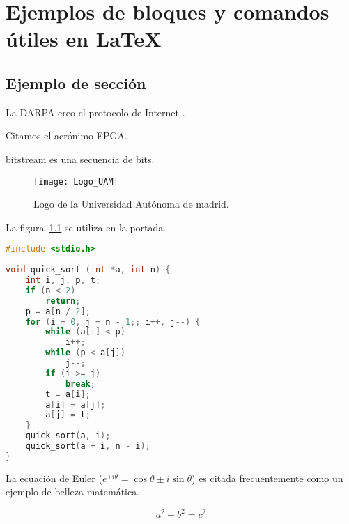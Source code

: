 \chapter{Ejemplos de bloques y comandos útiles en LaTeX\label{extra:ejemplos}}
\section{Ejemplo de sección}

%
%

La DARPA creo el protocolo de Internet \cite{ipv4sta}.

Citamos el acrónimo \gls{FPGA}.

\Gls{bitstream} es una secuencia de bits.

\begin{figure}[htp!]
  \centering
  \texttt{[image: Logo\_UAM]}
  \caption{Logo de la Universidad Autónoma de madrid.}
  \label{fig:logo_uam}
\end{figure} 

La figura~\ref{fig:logo_uam} se utiliza en la portada.

\clearpage

\begin{lstlisting}[label=algoritmo:quicksort,language=C,frame=single,caption=Algoritmo de ordenación Quicksort]
#include <stdio.h>
 
void quick_sort (int *a, int n) {
    int i, j, p, t;
    if (n < 2)
        return;
    p = a[n / 2];
    for (i = 0, j = n - 1;; i++, j--) {
        while (a[i] < p)
            i++;
        while (p < a[j])
            j--;
        if (i >= j)
            break;
        t = a[i];
        a[i] = a[j];
        a[j] = t;
    }
    quick_sort(a, i);
    quick_sort(a + i, n - i);
}
\end{lstlisting}

La ecuación de Euler ($e^{ \pm i\theta } = \cos \theta \pm i\sin \theta$) es citada frecuentemente como un ejemplo de belleza matemática.

\begin{equation}\label{eq:pythagoras}
a^2 + b^2 = c^2
\end{equation}